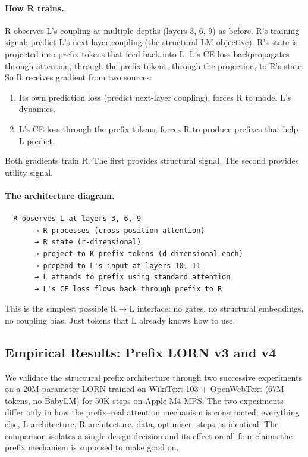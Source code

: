\documentclass[11pt, a4paper]{article}
\theoremstyle{plain}
\theoremstyle{definition}
\theoremstyle{remark}
\begin{document}
\paragraph{How R trains.}
R observes L's coupling at multiple depths (layers 3, 6, 9) as before.
R's training signal: predict L's next-layer coupling (the structural LM objective).
R's state is projected into prefix tokens that feed back into L.
L's CE loss backpropagates through attention, through the prefix tokens, through the projection, to R's state.
So R receives gradient from two sources:
\begin{enumerate}[nosep]
\item Its own prediction loss (predict next-layer coupling), forces R to model L's dynamics.
\item L's CE loss through the prefix tokens, forces R to produce prefixes that help L predict.
\end{enumerate}
Both gradients train R. The first provides structural signal. The second provides utility signal.

\paragraph{The architecture diagram.}
\begin{verbatim}
  R observes L at layers 3, 6, 9
       → R processes (cross-position attention)
       → R state (r-dimensional)
       → project to K prefix tokens (d-dimensional each)
       → prepend to L's input at layers 10, 11
       → L attends to prefix using standard attention
       → L's CE loss flows back through prefix to R
\end{verbatim}

This is the simplest possible R$\to$L interface: no gates, no structural embeddings, no coupling bias.
Just tokens that L already knows how to use.


\subsection{Empirical Results: Prefix LORN v3 and v4}
\label{sec:prefix-results}

We validate the structural prefix architecture through two successive experiments on a 20M-parameter LORN trained on WikiText-103 + OpenWebText (67M tokens, no BabyLM) for 50K steps on Apple M4 MPS.
The two experiments differ only in how the prefix--real attention mechanism is constructed; everything else, L architecture, R architecture, data, optimiser, steps, is identical.
The comparison isolates a single design decision and its effect on all four claims the prefix mechanism is supposed to make good on.
\end{document}
